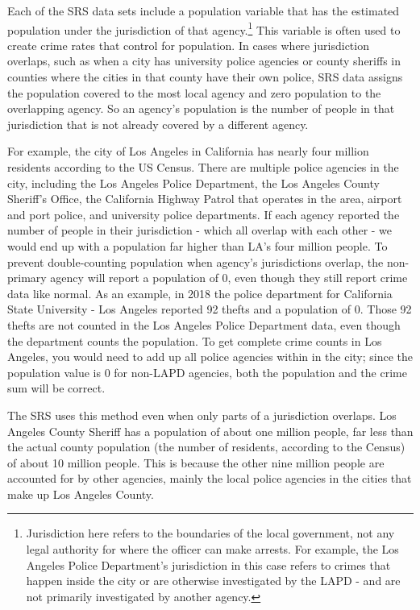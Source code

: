 \documentclass[
]{krantz}
\begin{document}
Each of the SRS data sets include a population variable that
has the estimated population under the jurisdiction of that
agency.\footnote{Jurisdiction here refers to the boundaries
  of the local government, not any legal authority for where
  the officer can make arrests. For example, the Los Angeles
  Police Department's jurisdiction in this case refers to
  crimes that happen inside the city or are otherwise
  investigated by the LAPD - and are not primarily
  investigated by another agency.} This variable is often
used to create crime rates that control for population. In
cases where jurisdiction overlaps, such as when a city has
university police agencies or county sheriffs in counties
where the cities in that county have their own police, SRS
data assigns the population covered to the most local agency
and zero population to the overlapping agency. So an
agency's population is the number of people in that
jurisdiction that is not already covered by a different
agency.

For example, the city of Los Angeles in California has
nearly four million residents according to the US Census.
There are multiple police agencies in the city, including
the Los Angeles Police Department, the Los Angeles County
Sheriff's Office, the California Highway Patrol that
operates in the area, airport and port police, and
university police departments. If each agency reported the
number of people in their jurisdiction - which all overlap
with each other - we would end up with a population far
higher than LA's four million people. To prevent
double-counting population when agency's jurisdictions
overlap, the non-primary agency will report a population of
0, even though they still report crime data like normal. As
an example, in 2018 the police department for California
State University - Los Angeles reported 92 thefts and a
population of 0. Those 92 thefts are not counted in the Los
Angeles Police Department data, even though the department
counts the population. To get complete crime counts in Los
Angeles, you would need to add up all police agencies within
in the city; since the population value is 0 for non-LAPD
agencies, both the population and the crime sum will be
correct.

The SRS uses this method even when only parts of a
jurisdiction overlaps. Los Angeles County Sheriff has a
population of about one million people, far less than the
actual county population (the number of residents, according
to the Census) of about 10 million people. This is because
the other nine million people are accounted for by other
agencies, mainly the local police agencies in the cities
that make up Los Angeles County.
\end{document}

